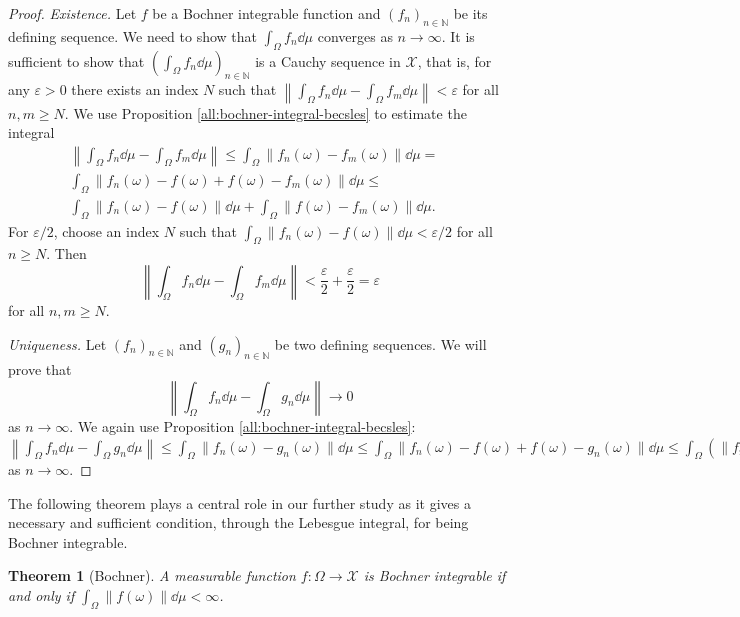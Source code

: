 \documentclass[a4paper, 12pt]{article}
\newtheorem{theo}[lem]{Theorem}
\begin{document}
\begin{proof} \emph{Existence.} Let $f$ be a Bochner integrable function and $(f_n)_{n \in \mathbb{N}}$ be its defining sequence. We need to show that $\int_{\Omega} f_n \dd{\mu}$ converges as $n \rightarrow \infty$. It is sufficient to show that $(\int_{\Omega} f_n \dd{\mu})_{n \in \mathbb{N}}$ is a Cauchy sequence in $\mathcal{X}$, that is, for any $\varepsilon > 0$ there exists an index $N$ such that $\left \| \int_{\Omega} f_n \dd{\mu} - \int_{\Omega} f_m \dd{\mu} \right \| < \varepsilon$ for all $n,m \geqslant N$. We use Proposition \ref{all:bochner-integral-becsles} to estimate the integral 
\begin{displaymath}
\begin{split}
\left \| \int_{\Omega} f_n \dd{\mu} - \int_{\Omega} f_m \dd{\mu} \right \| \leqslant \int_{\Omega} \| f_n(\omega) - f_m(\omega) \| \dd{\mu} =& \\
 \int_{\Omega} \| f_n(\omega) - f(\omega) + f(\omega) - f_m(\omega) \|\dd{\mu} \leqslant & \\
\int_{\Omega} \| f_n(\omega) - f(\omega) \| \dd{\mu} + \int_{\Omega} \| f(\omega) - f_m(\omega) \| \dd{\mu}.
\end{split}
\end{displaymath}
For $\varepsilon/2$, choose an index $N$ such that $\int_{\Omega} \| f_n(\omega) - f(\omega) \| \dd{\mu} < \varepsilon/2$ for all $n \geqslant N$. Then 
$$
\left \| \int_{\Omega} f_n \dd{\mu} - \int_{\Omega} f_m \dd{\mu} \right \| < \frac{\varepsilon}{2} + \frac{\varepsilon}{2} = \varepsilon
$$
for all $n, m \geqslant N$.

\emph{Uniqueness.} Let $(f_n)_{n \in \mathbb{N}}$ and $(g_n)_{n \in \mathbb{N}}$ be two defining sequences. We will prove that 
$$
\left \| \int_{\Omega} f_n \dd{\mu} - \int_{\Omega} g_n \dd{\mu} \right \| \rightarrow 0
$$
as $n \rightarrow \infty$. We again use Proposition \ref{all:bochner-integral-becsles}: $\left \| \int_{\Omega} f_n \dd{\mu} - \int_{\Omega} g_n \dd{\mu} \right \| \leqslant \int_{\Omega} \| f_n(\omega) - g_n(\omega) \| \dd{\mu} \leqslant \int_{\Omega} \| f_n(\omega) - f(\omega) + f(\omega) - g_n(\omega) \| \dd{\mu} \leqslant \int_{\Omega} \left( \| f_n(\omega) - f(\omega) \| + \| f(\omega) - g_n(\omega) \| \right) \dd{\mu} \rightarrow 0$ as $n \rightarrow \infty$. 
\end{proof}
The following theorem plays a central role in our further study as it gives a necessary and sufficient condition, through the Lebesgue integral, for being Bochner integrable.
\begin{theo}[Bochner]\label{all:bochner-theorem}
A measurable function $f \colon \Omega \rightarrow \mathcal{X}$ is Bochner integrable if and only if $\int_{\Omega} \| f(\omega) \| \dd{\mu} < \infty$.
\end{theo}
\end{document}
